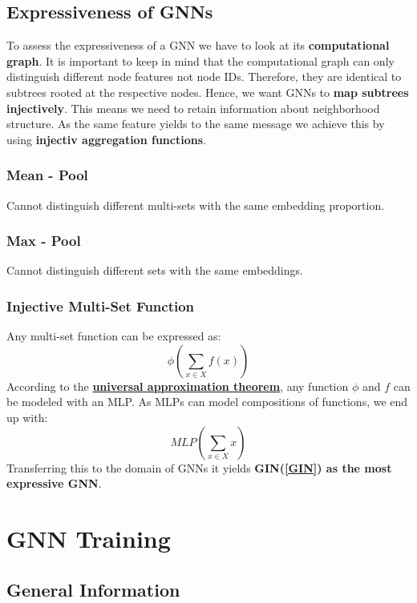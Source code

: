 \documentclass[parskip=full]{scrartcl}
\begin{document}
\subsection{Expressiveness of GNNs}
To assess the expressiveness of a GNN we have to look at its \textbf{computational graph}. It is important to keep in mind that the computational graph can only distinguish different node features not node IDs. Therefore, they are identical to subtrees rooted at the respective nodes.\newline
Hence, we want GNNs to \textbf{map subtrees injectively}. This means we need to retain information about neighborhood structure. As the same feature yields to the same message we achieve this by using \textbf{injectiv aggregation functions}.

\subsubsection{Mean - Pool}
Cannot distinguish different multi-sets with the same embedding proportion.

\subsubsection{Max - Pool}
Cannot distinguish different sets with the same embeddings.

\subsubsection{Injective Multi-Set Function}
Any multi-set function can be expressed as:
\[\phi\left(\sum_{x \in X} f(x)\right)\]
According to the \href{https://deeplearning.cs.cmu.edu/F21/document/readings/Hornik_Stinchcombe_White.pdf}{\textbf{universal approximation theorem}}, any function $\phi$ and $f$ can be modeled with an MLP. As MLPs can model compositions of functions, we end up with:
\[MLP\left(\sum_{x \in X} x\right)\]
Transferring this to the domain of GNNs it yields \textbf{GIN(\ref{GIN}) as the most expressive GNN}.


\section{GNN Training}

\subsection{General Information}
\end{document}

